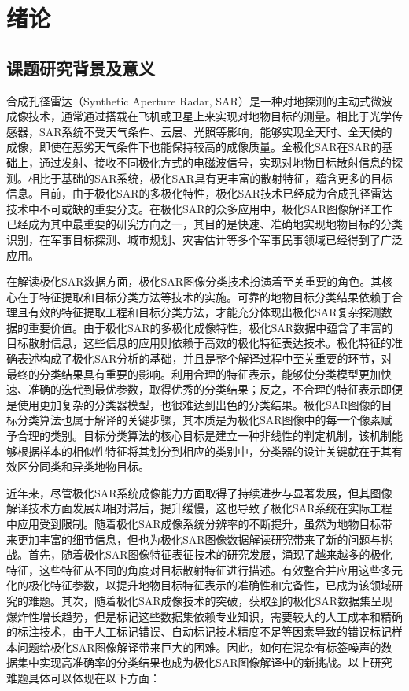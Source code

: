 \chapter{绪\hspace{6pt}论}

\section{课题研究背景及意义}
合成孔径雷达（Synthetic Aperture Radar, SAR）是一种对地探测的主动式微波成像技术，通常通过搭载在飞机或卫星上来实现对地物目标的测量。相比于光学传感器，SAR系统不受天气条件、云层、光照等影响，能够实现全天时、全天候的成像，即使在恶劣天气条件下也能保持较高的成像质量。全极化SAR在SAR的基础上，通过发射、接收不同极化方式的电磁波信号，实现对地物目标散射信息的探测。相比于基础的SAR系统，极化SAR具有更丰富的散射特征，蕴含更多的目标信息。目前，由于极化SAR的多极化特性，极化SAR技术已经成为合成孔径雷达技术中不可或缺的重要分支。在极化SAR的众多应用中，极化SAR图像解译工作已经成为其中最重要的研究方向之一，其目的是快速、准确地实现地物目标的分类识别，在军事目标探测、城市规划、灾害估计等多个军事民事领域已经得到了广泛应用。

在解读极化SAR数据方面，极化SAR图像分类技术扮演着至关重要的角色。其核心在于特征提取和目标分类方法等技术的实施。可靠的地物目标分类结果依赖于合理且有效的特征提取工程和目标分类方法，才能充分体现出极化SAR复杂探测数据的重要价值。由于极化SAR的多极化成像特性，极化SAR数据中蕴含了丰富的目标散射信息，这些信息的应用则依赖于高效的极化特征表达技术。极化特征的准确表述构成了极化SAR分析的基础，并且是整个解译过程中至关重要的环节，对最终的分类结果具有重要的影响。利用合理的特征表示，能够使分类模型更加快速、准确的迭代到最优参数，取得优秀的分类结果；反之，不合理的特征表示即便是使用更加复杂的分类器模型，也很难达到出色的分类结果。极化SAR图像的目标分类算法也属于解译的关键步骤，其本质是为极化SAR图像中的每一个像素赋予合理的类别。目标分类算法的核心目标是建立一种非线性的判定机制，该机制能够根据样本的相似性特征将其划分到相应的类别中，分类器的设计关键就在于其有效区分同类和异类地物目标。

近年来，尽管极化SAR系统成像能力方面取得了持续进步与显著发展，但其图像解译技术方面发展却相对滞后，提升缓慢，这也导致了极化SAR系统在实际工程中应用受到限制。随着极化SAR成像系统分辨率的不断提升，虽然为地物目标带来更加丰富的细节信息，但也为极化SAR图像数据解读研究带来了新的问题与挑战。首先，随着极化SAR图像特征表征技术的研究发展，涌现了越来越多的极化特征，这些特征从不同的角度对目标散射特征进行描述。有效整合并应用这些多元化的极化特征参数，以提升地物目标特征表示的准确性和完备性，已成为该领域研究的难题。其次，随着极化SAR成像技术的突破，获取到的极化SAR数据集呈现爆炸性增长趋势，但是标记这些数据集依赖专业知识，需要较大的人工成本和精确的标注技术，由于人工标记错误、自动标记技术精度不足等因素导致的错误标记样本问题给极化SAR图像解译带来巨大的困难。因此，如何在混杂有标签噪声的数据集中实现高准确率的分类结果也成为极化SAR图像解译中的新挑战。以上研究难题具体可以体现在以下方面：

